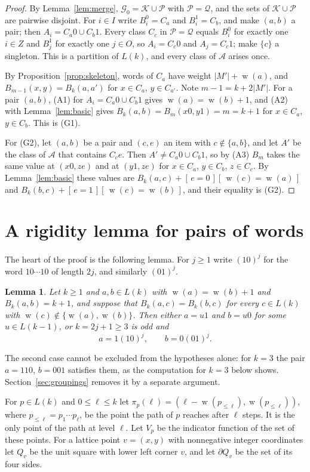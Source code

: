 \documentclass[screen]{aomart}
\newtheorem{lemma}[theorem]{Lemma}
\theoremstyle{definition}
\theoremstyle{remark}
\numberwithin{equation}{section}
\newcommand{\cA}{\mathcal{A}}
\newcommand{\cG}{\mathcal{G}}
\newcommand{\cK}{\mathcal{K}}
\newcommand{\cP}{\mathcal{P}}
\newcommand{\cQ}{\mathcal{Q}}
\newcommand{\Iv}[1]{[\,#1\,]}
\DeclareMathOperator{\wt}{w}
\begin{document}
\begin{proof}
By Lemma~\ref{lem:merge}, $\cG_0=\cK\cup\cP$ with $\cP=\cQ$, and the sets of $\cK\cup\cP$ are pairwise disjoint. For $i\in I$ write $B_i^0=C_a$ and $B_i^1=C_b$, and make $(a,b)$ a pair; then $A_i=C_a0\cup C_b1$. Every class $C_c$ in $\cP=\cQ$ equals $B_i^0$ for exactly one $i\in Z$ and $B_j^1$ for exactly one $j\in O$, so $A_i=C_c0$ and $A_j=C_c1$; make $\{c\}$ a singleton. This is a partition of $L(k)$, and every class of $\cA$ arises once.

By Proposition~\ref{prop:skeleton}, words of $C_a$ have weight $|M'|+\wt(a)$, and $B_{m-1}(x,y)=B_k(a,a')$ for $x\in C_a$, $y\in C_{a'}$. Note $m-1=k+2|M'|$. For a pair $(a,b)$, (A1) for $A_i=C_a0\cup C_b1$ gives $\wt(a)=\wt(b)+1$, and (A2) with Lemma~\ref{lem:basic} gives $B_k(a,b)=B_m(x0,y1)=m=k+1$ for $x\in C_a$, $y\in C_b$. This is (G1).

For (G2), let $(a,b)$ be a pair and $(c,e)$ an item with $c\notin\{a,b\}$, and let $A'$ be the class of $\cA$ that contains $C_ce$. Then $A'\ne C_a0\cup C_b1$, so by (A3) $B_m$ takes the same value at $(x0,z e)$ and at $(y1,ze)$ for $x\in C_a$, $y\in C_b$, $z\in C_c$. By Lemma~\ref{lem:basic} these values are $B_k(a,c)+\Iv{e=0}\Iv{\wt(c)=\wt(a)}$ and $B_k(b,c)+\Iv{e=1}\Iv{\wt(c)=\wt(b)}$, and their equality is (G2).
\end{proof}

\section{A rigidity lemma for pairs of words}\label{sec:star}

The heart of the proof is the following lemma. For $j\ge1$ write $(10)^j$ for the word $10\cdots10$ of length $2j$, and similarly $(01)^j$.

\begin{lemma}\label{lem:star}
Let $k\ge1$ and $a,b\in L(k)$ with $\wt(a)=\wt(b)+1$ and $B_k(a,b)=k+1$, and suppose that $B_k(a,c)=B_k(b,c)$ for every $c\in L(k)$ with $\wt(c)\notin\{\wt(a),\wt(b)\}$. Then either $a=u1$ and $b=u0$ for some $u\in L(k-1)$, or $k=2j+1\ge3$ is odd and
\[
a=1(10)^j,\qquad b=0(01)^j .
\]
\end{lemma}

The second case cannot be excluded from the hypotheses alone: for $k=3$ the pair $a=110$, $b=001$ satisfies them, as the computation for $k=3$ below shows. Section~\ref{sec:groupings} removes it by a separate argument.

For $p\in L(k)$ and $0\le\ell\le k$ let $\pi_p(\ell)=(\ell-\wt(p_{\le\ell}),\wt(p_{\le\ell}))$, where $p_{\le\ell}=p_1\cdots p_\ell$, be the point the path of $p$ reaches after $\ell$ steps. It is the only point of the path at level $\ell$. Let $V_p$ be the indicator function of the set of these points. For a lattice point $v=(x,y)$ with nonnegative integer coordinates let $Q_v$ be the unit square with lower left corner $v$, and let $\partial Q_v$ be the set of its four sides.
\end{document}
